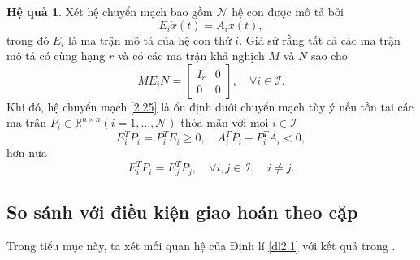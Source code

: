 \documentclass[12pt,a4paper]{report}
\theoremstyle{definition}
\newtheorem{corollary}{Hệ quả}
\theoremstyle{definition}
\numberwithin{dl}{chapter}
\numberwithin{vd}{chapter}
\numberwithin{corollary}{chapter}
\numberwithin{lemma}{chapter}
\numberwithin{md}{chapter}
\numberwithin{dn}{chapter}
\numberwithin{cy}{chapter}
\numberwithin{nx}{chapter}
\begin{document}
\begin{corollary} \label{hq2.1} Xét hệ chuyển mạch bao gồm $\mathcal{N}$ hệ con được mô tả bởi 
\begin{equation}\label{2.25}
E_{i} \dot{x}(t)=A_{i} x(t),
\end{equation}
trong đó $E_{i}$ là ma trận mô tả của hệ con thứ $i$. Giả sử rằng tất cả các ma trận mô tả có cùng hạng $r$ và có các ma trận khả nghịch $M$ và $N$ sao cho 
\begin{equation}\label{2.26}
M E_{i} N=\left[\begin{array}{cc}
I_{r} & 0 \\
0 & 0
\end{array}\right], \quad \forall i \in \mathcal{I}. 
\end{equation}
Khi đó, hệ chuyển mạch \eqref{2.25} là ổn định dưới chuyển mạch tùy ý nếu tồn tại các ma trận $P_{i} \in \mathbb{R}^{n \times n} (i=1, \ldots, \mathcal{N})$ thỏa mãn với mọi $i \in \mathcal{I}$
\begin{equation}\label{2.27}
E_{i}^{T} P_{i}=P_{i}^{T} E_{i} \geq 0, \quad A_{i}^{T} P_{i}+P_{i}^{T} A_{i}<0,
\end{equation}
hơn nữa
\begin{equation}\label{2.28}
E_{i}^{T} P_{i}=E_{j}^{T} P_{j}, \quad \forall i, j \in \mathcal{I}, \quad i \neq j. 
\end{equation}
\end{corollary} 
\subsection{So sánh với điều kiện giao hoán theo cặp} Trong tiểu mục này, ta xét mối quan hệ của Định lí \ref{dl2.1} với kết quả trong \cite{Zhai09a}.\\
\end{document}
